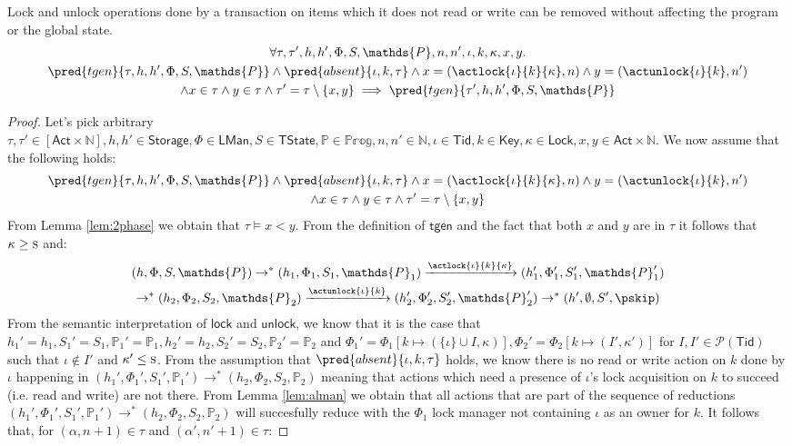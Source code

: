\lem \label{lem:lockAbsent} Lock and unlock operations done by a transaction on items which it does not read or write can be removed without affecting the program or the global state.
\begin{gather*}
	\forall \tau, \tau', h, h', \Phi, S, \mathds{P}, n, n', \iota, k, \kappa, x, y \ldotp
		\\
	\pred{tgen}{\tau, h, h', \Phi, S, \mathds{P}} \land  \pred{absent}{\iota, k, \tau} \land x = (\actlock{\iota}{k}{\kappa}, n) \land y = (\actunlock{\iota}{k}, n') \\ \land x \in \tau \land y \in \tau
	\land \tau' = \tau \setminus \{ x, y \}
		\implies
	\pred{tgen}{\tau', h, h', \Phi, S, \mathds{P}}
\end{gather*}
\begin{proof}
Let's pick arbitrary $\tau, \tau' \in [\mathsf{Act} \times \mathds{N}], h, h' \in \mathsf{Storage}, \Phi \in \mathsf{LMan}, S \in \mathsf{TState}, \mathds{P} \in \mathds{Prog}, n, n' \in \mathds{N}, \iota \in \mathsf{Tid}, k \in \mathsf{Key}, \kappa \in \mathsf{Lock}, x, y \in \mathsf{Act} \times \mathds{N}$. We now assume that the following holds:
\begin{gather*}
	\pred{tgen}{\tau, h, h', \Phi, S, \mathds{P}} \land  \pred{absent}{\iota, k, \tau} \land x = (\actlock{\iota}{k}{\kappa}, n) \land y = (\actunlock{\iota}{k}, n') \\ \land x \in \tau \land y \in \tau
	\land \tau' = \tau \setminus \{ x, y \}
\end{gather*}
From Lemma \ref{lem:2phase} we obtain that $\tau \vDash x < y$. From the definition of $\mathsf{tgen}$ and the fact that both $x$ and $y$ are in $\tau$ it follows that $\kappa \geq \textsc{s}$ and:
\begin{gather}
	(h, \Phi, S, \mathds{P}) \rightarrow^* (h_1, \Phi_1, S_1, \mathds{P}_1) \xrightarrow{\actlock{\iota}{k}{\kappa}} (h_1', \Phi_1', S_1', \mathds{P}_1') \\ \rightarrow^* (h_2, \Phi_2, S_2, \mathds{P}_2) \xrightarrow{\actunlock{\iota}{k}} (h_2', \Phi_2', S_2', \mathds{P}_2') \rightarrow^* (h', \emptyset, S', \pskip)
\end{gather}
From the semantic interpretation of $\mathsf{lock}$ and $\mathsf{unlock}$, we know that it is the case that $h_1' = h_1, S_1' = S_1, \mathds{P}_1' = \mathds{P}_1, h_2' = h_2, S_2' = S_2, \mathds{P}_2' = \mathds{P}_2$ and $\Phi_1' = \Phi_1[k \mapsto (\{\iota\} \cup I, \kappa)], \Phi_2' = \Phi_2[k \mapsto (I', \kappa')]$ for $I, I' \in \mathcal{P}(\mathsf{Tid})$ such that $\iota \not\in I'$ and $\kappa' \leq \textsc{s}$. From the assumption that $\pred{absent}{\iota, k, \tau}$ holds, we know there is no read or write action on $k$ done by $\iota$ happening in $(h_1', \Phi_1', S_1', \mathds{P}_1') \rightarrow^* (h_2, \Phi_2, S_2, \mathds{P}_2)$ meaning that actions which need a presence of $\iota$'s lock acquisition on $k$ to succeed (i.e. read and write) are not there. From Lemma \ref{lem:alman} we obtain that all actions that are part of the sequence of reductions $(h_1', \Phi_1', S_1', \mathds{P}_1') \rightarrow^* (h_2, \Phi_2, S_2, \mathds{P}_2)$ will succesfully reduce with the $\Phi_1$ lock manager not containing $\iota$ as an owner for $k$. It follows that, for $(\alpha, n+1) \in \tau$ and $(\alpha', n'+1) \in \tau$:

\end{proof}
